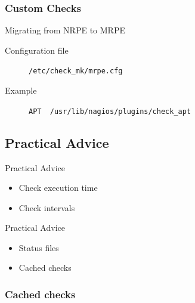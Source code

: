


\subsubsection{Custom Checks}

\begin{frame}[fragile]{Migrating from NRPE to MRPE}
\begin{description}
\item[Configuration file] \verb|/etc/check_mk/mrpe.cfg|
\item[Example] \verb|APT  /usr/lib/nagios/plugins/check_apt|
\end{description}
\end{frame}

\subsection{Practical Advice}
\begin{frame}{Practical Advice}
\begin{itemize}
\item Check execution time
\item Check intervals
\end{itemize}
\end{frame}

\begin{frame}{Practical Advice}
\begin{itemize}
\item Status files
\item Cached checks
\end{itemize}
\end{frame}

\subsubsection{Cached checks}

